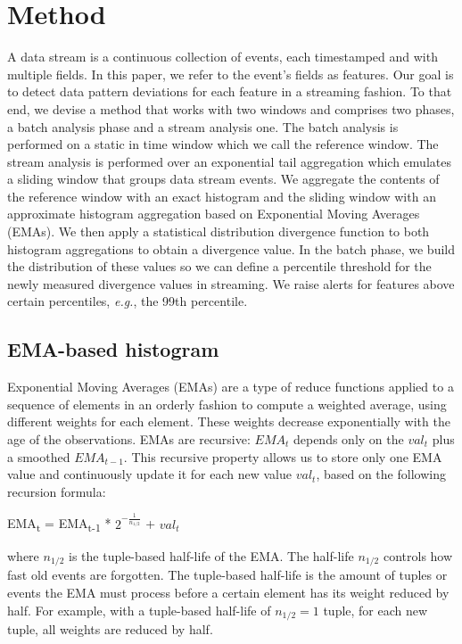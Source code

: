 \documentclass[sigconf]{acmart}
\begin{document}

\section{Method}
\label{sec:Method}
A data stream is a continuous collection of events, each timestamped and with multiple fields. In this paper, we refer to the event's fields as features. Our goal is to detect data pattern deviations for each feature in a streaming fashion. To that end, we devise a method that works with two windows and comprises two phases, a batch analysis phase and a stream analysis one. The batch analysis is performed on a static in time window which we call the reference window. The stream analysis is performed over an exponential tail aggregation which emulates a sliding window that groups data stream events. We aggregate the contents of the reference window with an exact histogram and the sliding window with an approximate histogram aggregation based on Exponential Moving Averages (EMAs). We then apply a statistical distribution divergence function to both histogram aggregations to obtain a divergence value. In the batch phase, we build the distribution of these values so we can define a percentile threshold for the newly measured divergence values in streaming. We raise alerts for features above certain percentiles, \textit{e.g.}, the 99th percentile.

\subsection{EMA-based histogram} \label{sec:ema-hist}
Exponential Moving Averages (EMAs) \cite{EMA-Everett2011, EMA-Hunter, EMA-MarcusB} are a type of reduce functions applied to a sequence of elements in an orderly fashion to compute a weighted average, using different weights for each element. These weights decrease exponentially with the age of the observations. EMAs are recursive: $EMA_t$ depends only on the $val_t$ plus a smoothed $EMA_{t-1}$. This recursive property allows us to store only one EMA value and continuously update it for each new value $val_t$, based on the following recursion formula:
\begin{definition}
EMA\textsubscript{t} = EMA\textsubscript{t-1} * $2^{-\frac{1}{n_{1/2}}}$ + $val_t$
\label{def:tuple-ema}
\end{definition} where $n_{1/2}$ is the tuple-based half-life of the EMA. 
The half-life $n_{1/2}$ controls how fast old events are forgotten. The tuple-based half-life is the amount of tuples or events the EMA must process before a certain element has its weight reduced by half. For example, with a tuple-based half-life of $n_{1/2}=1$ tuple, for each new tuple, all weights are reduced by half. 
\end{document}
